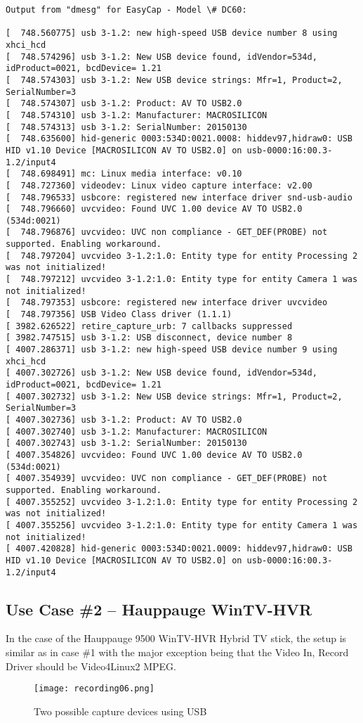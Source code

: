 \begin{lstlisting}[style=sh]
Output from "dmesg" for EasyCap - Model \# DC60:

[  748.560775] usb 3-1.2: new high-speed USB device number 8 using xhci_hcd
[  748.574296] usb 3-1.2: New USB device found, idVendor=534d, idProduct=0021, bcdDevice= 1.21
[  748.574303] usb 3-1.2: New USB device strings: Mfr=1, Product=2, SerialNumber=3
[  748.574307] usb 3-1.2: Product: AV TO USB2.0
[  748.574310] usb 3-1.2: Manufacturer: MACROSILICON
[  748.574313] usb 3-1.2: SerialNumber: 20150130
[  748.635600] hid-generic 0003:534D:0021.0008: hiddev97,hidraw0: USB HID v1.10 Device [MACROSILICON AV TO USB2.0] on usb-0000:16:00.3-1.2/input4
[  748.698491] mc: Linux media interface: v0.10
[  748.727360] videodev: Linux video capture interface: v2.00
[  748.796533] usbcore: registered new interface driver snd-usb-audio
[  748.796660] uvcvideo: Found UVC 1.00 device AV TO USB2.0 (534d:0021)
[  748.796876] uvcvideo: UVC non compliance - GET_DEF(PROBE) not supported. Enabling workaround.
[  748.797204] uvcvideo 3-1.2:1.0: Entity type for entity Processing 2 was not initialized!
[  748.797212] uvcvideo 3-1.2:1.0: Entity type for entity Camera 1 was not initialized!
[  748.797353] usbcore: registered new interface driver uvcvideo
[  748.797356] USB Video Class driver (1.1.1)
[ 3982.626522] retire_capture_urb: 7 callbacks suppressed
[ 3982.747515] usb 3-1.2: USB disconnect, device number 8
[ 4007.286371] usb 3-1.2: new high-speed USB device number 9 using xhci_hcd
[ 4007.302726] usb 3-1.2: New USB device found, idVendor=534d, idProduct=0021, bcdDevice= 1.21
[ 4007.302732] usb 3-1.2: New USB device strings: Mfr=1, Product=2, SerialNumber=3
[ 4007.302736] usb 3-1.2: Product: AV TO USB2.0
[ 4007.302740] usb 3-1.2: Manufacturer: MACROSILICON
[ 4007.302743] usb 3-1.2: SerialNumber: 20150130
[ 4007.354826] uvcvideo: Found UVC 1.00 device AV TO USB2.0 (534d:0021)
[ 4007.354939] uvcvideo: UVC non compliance - GET_DEF(PROBE) not supported. Enabling workaround.
[ 4007.355252] uvcvideo 3-1.2:1.0: Entity type for entity Processing 2 was not initialized!
[ 4007.355256] uvcvideo 3-1.2:1.0: Entity type for entity Camera 1 was not initialized!
[ 4007.420828] hid-generic 0003:534D:0021.0009: hiddev97,hidraw0: USB HID v1.10 Device [MACROSILICON AV TO USB2.0] on usb-0000:16:00.3-1.2/input4
\end{lstlisting}

\newpage

\subsection{Use Case \#2 – Hauppauge WinTV-HVR}
\label{sub:use_case_wintv}
 
In the case of the Hauppauge 9500 WinTV-HVR Hybrid TV stick, the setup is similar as in case
\#1 with the major exception being that the Video In, Record Driver should be Video4Linux2 MPEG.

\begin{figure}[htpb]
    \centering
    \texttt{[image: recording06.png]}
    \caption{Two possible capture devices using USB}
    \label{fig:recording-usb}
\end{figure}

